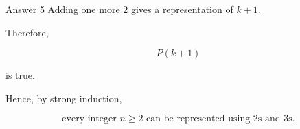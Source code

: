 \begin{frame}{Answer 5}
Adding one more $2$ gives a representation of $k+1$.

Therefore,

$$
P(k+1)
$$

is true.

Hence, by strong induction,

$$
\boxed{\text{every integer }n\geq2\text{ can be represented using }2\text{s and }3\text{s}.}
$$

\end{frame}
